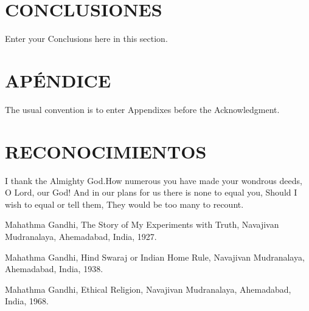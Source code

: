 \documentclass[a4paper, 10pt, conference]{ieeeconf}      %
\begin{document}


\section{CONCLUSIONES}

Enter your Conclusions here in this section. 

\addtolength{\textheight}{-12cm}   


\section*{APÉNDICE}

The usual convention is to enter Appendixes before the Acknowledgment.


\section*{RECONOCIMIENTOS}



I thank the Almighty God.How numerous you have made your wondrous deeds,
O Lord, our God! And in our plans for us there is none to equal you,
Should I wish to equal or tell them,
They would be too many to recount.



\begin{thebibliography}{99}

 Mahathma Gandhi, The Story of My Experiments with Truth, Navajivan Mudranalaya,   
Ahemadabad, India, 1927.

 Mahathma Gandhi, Hind Swaraj or Indian Home Rule, Navajivan Mudranalaya,   
Ahemadabad, India, 1938.

  Mahathma Gandhi, Ethical Religion, Navajivan Mudranalaya,   
Ahemadabad, India, 1968.
 

\end{thebibliography}
\end{document}

